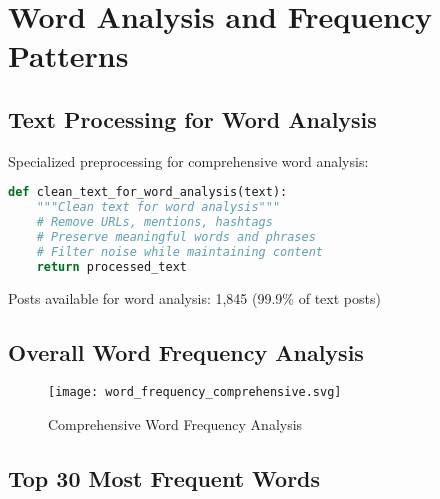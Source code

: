 \documentclass[12pt,a4paper]{article}
\begin{document}
\section{Word Analysis and Frequency Patterns}

\subsection{Text Processing for Word Analysis}

Specialized preprocessing for comprehensive word analysis:

\begin{lstlisting}[language=Python, caption=Word Analysis Text Cleaning]
def clean_text_for_word_analysis(text):
    """Clean text for word analysis"""
    # Remove URLs, mentions, hashtags
    # Preserve meaningful words and phrases
    # Filter noise while maintaining content
    return processed_text
\end{lstlisting}

Posts available for word analysis: 1,845 (99.9\% of text posts)

\subsection{Overall Word Frequency Analysis}

\begin{figure}[H]
\centering
\texttt{[image: word\_frequency\_comprehensive.svg]}
\caption{Comprehensive Word Frequency Analysis}
\label{fig:word_frequency}
\end{figure}

\subsection{Top 30 Most Frequent Words}
\end{document}

